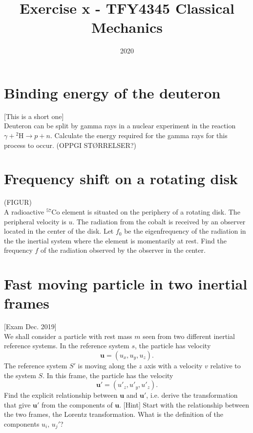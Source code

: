 \documentclass{article}
\title{Exercise x - TFY4345 Classical Mechanics}
\date{2020}
\begin{document}
    \maketitle
    \section{Binding energy of the deuteron}
    [This is a short one] \\
    Deuteron can be split by gamma rays in a nuclear experiment in the reaction $\gamma + {^2\mathrm{H}} \rightarrow p + n$. Calculate the energy required for the gamma rays for this process to occur. (OPPGI STØRRELSER?)

    \section{Frequency shift on a rotating disk}
    (FIGUR) \\
    A radioactive $^{57}\mathrm{Co}$ element is situated on the periphery of a rotating disk. The peripheral velocity is $u$. The radiation from the cobalt is received by an observer located in the center of the disk. Let $f_0$ be the eigenfrequency of the radiation in the the inertial system where the element is momentarily at rest. Find the frequency $f$ of the radiation observed by the observer in the center.
    
    \section{Fast moving particle in two inertial frames}
    [Exam Dec. 2019] \\
    We shall consider a particle with rest mass $m$ seen from two different inertial reference systems. In the reference system $s$, the particle has velocity
    \begin{equation*}
        \mathbf{u} = (u_x, u_y, u_z).
    \end{equation*} 
    The reference system $S'$ is moving along the $z$ axis with a velocity $v$ relative to the system $S$. In this frame, the particle has the velocity
    \begin{equation*}
        \mathbf{u'} = (u'_z, u'_y, u'_z).
    \end{equation*}
    Find the explicit relationship between $\mathbf{u}$ and $\mathbf{u'}$, i.e. derive the transformation that give $\mathbf{u'}$ from the components of $\mathbf{u}$. [Hint] Start with the relationship between the two frames, the Lorentz transformation. What is the definition of the components $u_i, \, u_j'$?
\end{document}
